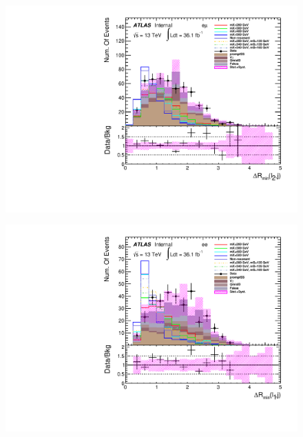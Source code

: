 \begin{figure}[h]
\begin{minipage}[t]{0.33\linewidth}
 \includegraphics[width=1.0\textwidth,angle=-90]{fig/dataMC_high_Njet_CR/mindR_l2j_emu.pdf}\label{fig:dataMC_high_Njet_CR:mindRl2j_emu.pdf}
 \end{minipage}
 \begin{minipage}[t]{0.33\linewidth}
 \centering
 \includegraphics[width=1.0\textwidth,angle=-90]{fig/dataMC_high_Njet_CR/mindR_l1j_ee.pdf}\label{fig:dataMC_high_Njet_CR:mindRl1j_ee.pdf}
 \end{minipage}
 \begin{minipage}[t]{0.33\linewidth}
 \centering

\end{minipage}
\end{figure}

